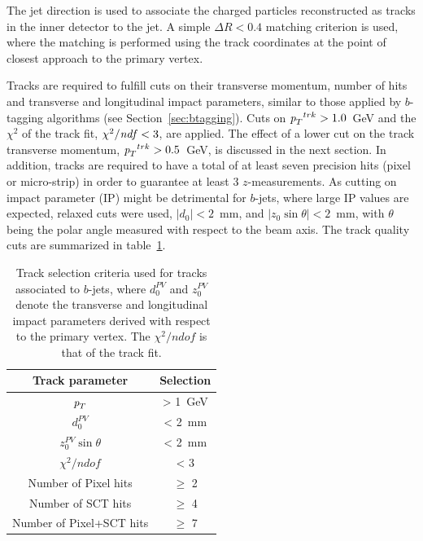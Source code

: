 The jet direction is used to associate the charged particles reconstructed as tracks in the inner detector to the jet.   A simple $\Delta R < 0.4$ matching criterion is used, where the matching is performed using the track coordinates at the point of closest approach to the primary vertex.

Tracks are required to fulfill cuts on their transverse momentum, number of hits and transverse and longitudinal impact parameters, similar to those applied by $b$-tagging algorithms (see Section~\ref{sec:btagging}).  Cuts on ${\emph{p}_{T}}^{trk}>1.0$~GeV and the $\chi^2$ of the track fit, $\chi^2/{\it ndf}<3$, are applied. The effect of a lower cut on the track transverse momentum, ${\emph{p}_{T}}^{trk}>0.5$~GeV, is discussed in the next section.  In addition, tracks are required to have a total of at least seven precision hits (pixel or micro-strip) in order to guarantee at least 3 $z$-measurements.  As cutting on impact parameter (IP) might be detrimental for $b$-jets, where large IP values are expected, relaxed cuts were used, $|d_{0}|<2$~mm, and $|z_{0}\sin\theta|<2$~mm, with $\theta$ being the polar angle measured with respect to the beam axis. The track quality cuts are summarized in table~\ref{tb:tracks}. %


\begin{table}[!hbt] %
\renewcommand{\arraystretch}{1.2}
\centering
\begin{tabular}{ c  c  }
  \hline
  Track parameter &  Selection \\ \hline
  ${\emph{p}_{T}}$   &   > 1~GeV \\
  $d_0^{PV}$   &   < 2~mm \\
  $z_0^{PV}\sin \theta$   &   < 2~mm \\
  $\chi^2 /ndof$   &   < 3 \\
  Number of Pixel hits   &  $\geq$ 2 \\
  Number of SCT hits   &   $\geq$ 4 \\
  Number of Pixel+SCT hits   &  $\geq$ 7 \\ \hline
\end{tabular}
\caption{Track selection criteria used for tracks associated to $b$-jets, where $d_0^{PV}$ and $z_0^{PV}$ denote the transverse and longitudinal impact parameters derived with respect to the primary vertex. The $\chi^2 / ndof$ is that of the track fit.}
\label{tb:tracks}
\end{table}





